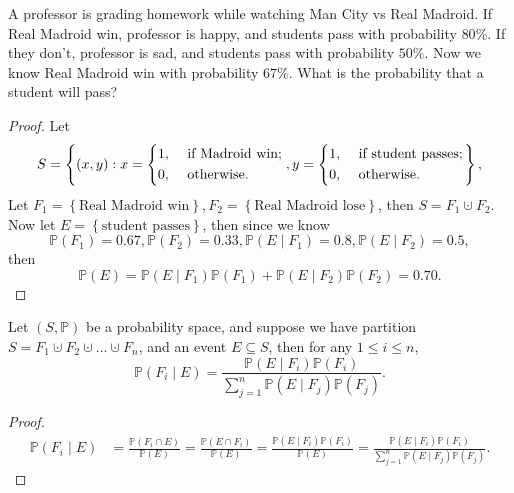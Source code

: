 \begin{eg}
    A professor is grading homework while watching Man City vs Real Madroid. If Real Madroid win, professor is happy, and students pass with probability \(80 \%\). If they don't, professor is sad, and students pass with probability \(50 \%\). Now we know Real Madroid win with probability \(67 \%\). What is the probability that a student will pass?   
\end{eg}
\begin{proof}
    Let
    \[
        S = \left\{ (x, y): x = \begin{dcases}
            1, &\text{ if } \text{Madroid win}  ;\\
            0, &\text{ otherwise}.
        \end{dcases}, y = \begin{dcases}
            1, &\text{ if } \text{student passes}  ;\\
            0, &\text{ otherwise}.
        \end{dcases} \right\}, 
    \]
    Let \(F_1 = \left\{ \text{Real Madroid win}  \right\}, F_2 = \left\{ \text{Real Madroid lose}  \right\}  \), then \(S = F_1 \cupdot F_2\). Now let \(E = \left\{ \text{student passes}  \right\} \), then since we know 
    \[
        \mathbb{P} (F_1) = 0.67, \mathbb{P} (F_2) = 0.33, \mathbb{P} (E \mid F_1) = 0.8, \mathbb{P} (E \mid F_2) = 0.5,
    \]   
    then 
    \[
        \mathbb{P} (E) = \mathbb{P} (E \mid F_1) \mathbb{P} (F_1) + \mathbb{P} (E \mid F_2) \mathbb{P} (F_2) = 0.70.
    \]
\end{proof}

\begin{theorem}
    Let \((S, \mathbb{P} )\) be a probability space, and suppose we have partition \(S = F_1 \cupdot F_2 \cupdot \dots \cupdot F_n\), and an event \(E \subseteq S\), then for any \(1 \le i \le n\),
    \[
        \mathbb{P} (F_i \mid E) = \frac{\mathbb{P} (E \mid F_i) \mathbb{P} (F_i)}{\sum_{j=1}^n \mathbb{P} (E \mid F_j) \mathbb{P} (F_j) }.
    \]    
\end{theorem}
\begin{proof}
    \begin{align*}
        \mathbb{P} (F_i \mid E) &= \frac{\mathbb{P} (F_i \cap E)}{\mathbb{P} (E)} = \frac{\mathbb{P} (E \cap F_i)}{\mathbb{P} (E)} = \frac{\mathbb{P} (E \mid F_i) \mathbb{P} (F_i)}{\mathbb{P} (E)} = \frac{\mathbb{P} (E \mid F_i) \mathbb{P} (F_i)}{\sum_{j=1}^n \mathbb{P} (E \mid F_j) \mathbb{P} (F_j) }.
    \end{align*}
\end{proof}

